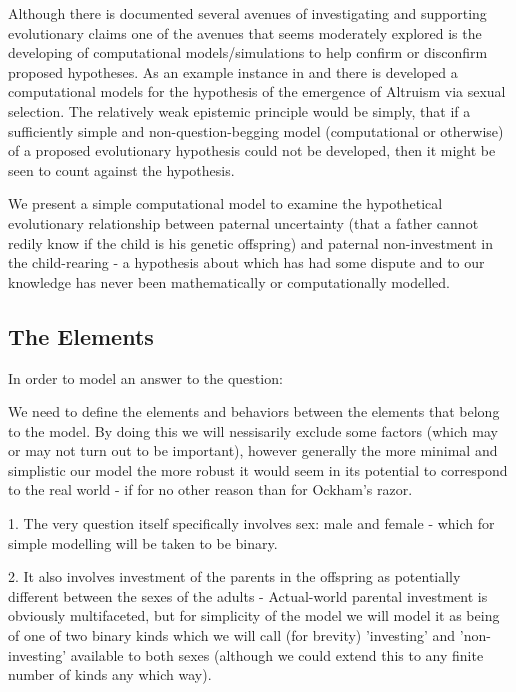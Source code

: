 \documentclass[journal,article,accept,oneauthors,pdftex,10pt,a4paper]{mdpi}
\begin{document}
Although there is documented several avenues of investigating and supporting evolutionary claims \cite{confirmation} one of the avenues that seems moderately explored is the developing of computational models/simulations to help confirm or disconfirm proposed hypotheses.  As an example instance in \cite{altruism} and \cite{altruism2} there is developed a computational models for the hypothesis of the emergence of Altruism via sexual selection.
The relatively weak epistemic principle would be simply, that if a sufficiently simple and non-question-begging model (computational or otherwise) of a proposed evolutionary hypothesis could not be developed, then it might be seen to count against the hypothesis.

We present a simple computational model to examine the hypothetical evolutionary relationship between paternal uncertainty (that a father cannot redily know if the child is his genetic offspring) and paternal non-investment in the child-rearing - a hypothesis about which has had some dispute \cite{paternity1}\cite{paternity2} and to our knowledge has never been mathematically or computationally modelled.

\subsection{The Elements}

In order to model an answer to the question:
\begin{center}
\end{center}

We need to define the elements and behaviors between the elements that belong to the model.
By doing this we will nessisarily exclude some factors (which may or may not turn out to be important), however generally the more minimal and simplistic our model the more robust it would seem in its potential to correspond to the real world - if for no other reason than for Ockham's razor.

1. The very question itself specifically involves sex: male and female - which for simple modelling will be taken to be binary.

2. It also involves investment of the parents in the offspring as potentially different between the sexes of the adults - Actual-world parental investment is obviously multifaceted, but for simplicity of the model we will model it as being of one of two binary kinds which we will call (for brevity) 'investing' and 'non-investing' available to both sexes (although we could extend this to any finite number of kinds any which way).
\end{document}
